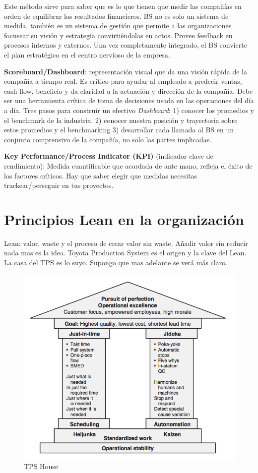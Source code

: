\documentclass[]{article}
\begin{document}
Este método sirve para saber que es lo que tienen que medir las compañías en orden de equilibrar los resultados financieros. 
BS no es solo un sistema de medida, también es un sistema de gestión que permite a las organizaciones focusear su visión y estrategia convirtiéndolas en actos. Provee feedback en procesos internos y externos. Una vez completamente integrado, el BS convierte el plan estratégico en el centro nervioso de la empresa.

\textbf{Scoreboard/Dashboard}: representación visual que da una visión rápida de la compañía a tiempo real. Es crítico para ayudar al empleado a predecir ventas, cash flow, beneficio y da claridad a la actuación y dirección de la compañía. Debe ser una herramienta crítica de toma de decisiones usada en las operaciones del día a día. Tres pasos para construir un efectivo \textit{Dashboard}: 1) conocer los promedios y el benchmark de la industria. 2) conocer nuestra posición y trayectoria sobre estos promedios y el benchmarking 3) desarrollar cada llamada al BS en un conjunto comprensivo de la compañía, no solo las partes implicadas.

\textbf{Key Performance/Process Indicator (KPI)} (indicador clave de rendimiento): Medida cuantificable que acordada de ante mano, refleja el éxito de los factores críticos. Hay que saber elegir que medidas necesitas trackear/perseguir en tus proyectos. 

\section{Principios Lean en la organización}

Lean: valor, waste y el proceso de crear valor sin waste. Añadir valor sin reducir nada mas es la idea. Toyota Production System es el origen y la clave del Lean. La casa del TPS es lo suyo. Supongo que mas adelante se verá más claro.

\begin{figure}[ht!]
	\centering
	\includegraphics[width=120mm]{imagenes/TPSHouse.png}
	\caption{TPS House}
	\label{fig:TPS House}
\end{figure}
\end{document}
